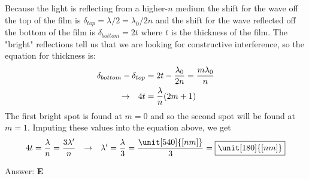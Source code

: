 \documentclass[12pt]{article}
\newcommand{\Answer}[1]{Answer: \textbf{#1}}
\newcommand{\Problem}[3]{
    \setcounter{section}{#1}
    \addtocounter{section}{-1}
    \section{}
    #3\par\par
    \Answer{#2}
}
\begin{document}
\Problem{75}{E}{%
Because the light is reflecting from a higher-$n$ medium the shift for the wave off the top of the film is $\delta_{top} = \lambda/2 = \lambda_{0}/2n$ and the shift for the wave reflected off the bottom of the film is $\delta_{bottom} =2t$ where $t$ is the thickness of the film. The "bright" reflections tell us that we are looking for constructive interference, so the equation for thickness is:
\begin{align}
\delta_{bottom} - \delta_{top} &= 2t - \frac{\lambda_{0}}{2n}  = \frac{m\lambda_{0}}{n}\nonumber\\
\rightarrow \hspace{.1in} 4t &= \frac{\lambda}{n} (2m +1)\nonumber
\end{align}
The first bright spot is found at $m=0$ and so the second spot will be found at $m = 1$. Imputing these values into the equation above, we get
\begin{align}
4 t =  \frac{\lambda}{n} = \frac{3 \lambda '}{n}  \hspace{.1in} \rightarrow  \hspace{.1in} \lambda ' = \frac{\lambda}{3} = \frac{\unit[540]{[nm]}}{3} =\boxed{\unit[180]{[nm]}}\nonumber
\end{align}
}
\end{document}
